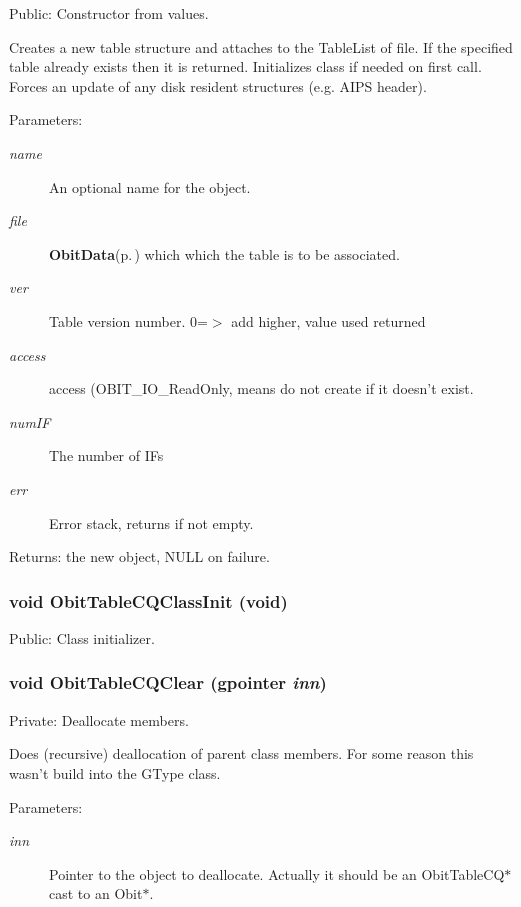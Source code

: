 Public: Constructor from values. 

Creates a new table structure and attaches to the Table\-List of file. If the specified table already exists then it is returned. Initializes class if needed on first call. Forces an update of any disk resident structures (e.g. AIPS header). \begin{Desc}
\item[Parameters:]
\begin{description}
\item[{\em name}]An optional name for the object. \item[{\em file}]{\bf Obit\-Data}{\rm (p.\,\pageref{structObitData})} which which the table is to be associated. \item[{\em ver}]Table version number. 0=$>$ add higher, value used returned \item[{\em access}]access (OBIT\_\-IO\_\-Read\-Only, means do not create if it doesn't exist. \item[{\em num\-IF}]The number of IFs \item[{\em err}]Error stack, returns if not empty. \end{description}
\end{Desc}
\begin{Desc}
\item[Returns:]the new object, NULL on failure. \end{Desc}
\subsubsection{\setlength{\rightskip}{0pt plus 5cm}void Obit\-Table\-CQClass\-Init (void)}\label{ObitTableCQ_8c_a27}


Public: Class initializer. 

\subsubsection{\setlength{\rightskip}{0pt plus 5cm}void Obit\-Table\-CQClear (gpointer {\em inn})}\label{ObitTableCQ_8c_a9}


Private: Deallocate members. 

Does (recursive) deallocation of parent class members. For some reason this wasn't build into the GType class. \begin{Desc}
\item[Parameters:]
\begin{description}
\item[{\em inn}]Pointer to the object to deallocate. Actually it should be an Obit\-Table\-CQ$\ast$ cast to an Obit$\ast$. \end{description}
\end{Desc}
